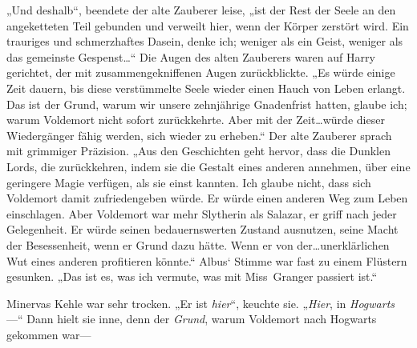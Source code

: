 „Und deshalb“, beendete der alte Zauberer leise, „ist der Rest der Seele an den angeketteten Teil gebunden und verweilt hier, wenn der Körper zerstört wird. Ein trauriges und schmerzhaftes Dasein, denke ich; weniger als ein Geist, weniger als das gemeinste Gespenst…“
Die Augen des alten Zauberers waren auf Harry gerichtet, der mit zusammengekniffenen Augen zurückblickte.
„Es würde einige Zeit dauern, bis diese verstümmelte Seele wieder einen Hauch von Leben erlangt. Das ist der Grund, warum wir unsere zehnjährige Gnadenfrist hatten, glaube ich; warum Voldemort nicht sofort zurückkehrte. Aber mit der Zeit…würde dieser Wiedergänger fähig werden, sich wieder zu erheben.“
Der alte Zauberer sprach mit grimmiger Präzision.
„Aus den Geschichten geht hervor, dass die Dunklen Lords, die zurückkehren, indem sie die Gestalt eines anderen annehmen, über eine geringere Magie verfügen, als sie einst kannten. Ich glaube nicht, dass sich Voldemort damit zufriedengeben würde. Er würde einen anderen Weg zum Leben einschlagen. Aber Voldemort war mehr Slytherin als Salazar, er griff nach jeder Gelegenheit. Er würde seinen bedauernswerten Zustand ausnutzen, seine Macht der Besessenheit, wenn er Grund dazu hätte. Wenn er von der…unerklärlichen Wut eines anderen profitieren könnte.“ Albus‘ Stimme war fast zu einem Flüstern gesunken.
„Das ist es, was ich vermute, was mit Miss~Granger passiert ist.“

%
Minervas Kehle war sehr trocken. „Er ist \emph{hier}“, keuchte sie. „\emph{Hier}, in \emph{Hogwarts}—“ Dann hielt sie inne, denn der \emph{Grund}, warum Voldemort nach Hogwarts gekommen war—

